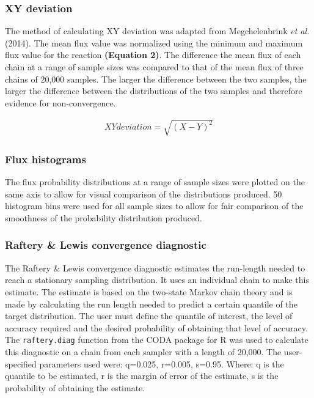 \documentclass[10pt,letterpaper]{article}
\begin{document}
\subsubsection*{XY deviation}
The method of calculating XY deviation was adapted from Megchelenbrink \textit{et al.} (2014)\cite{Megchelenbrink}. The mean flux value was normalized using the minimum and maximum flux value for the reaction \textbf{(Equation 2)}. The difference the mean flux of each chain at a range of sample sizes was compared to that of the mean flux of three chains of 20,000 samples. The larger the difference between the two samples, the larger the difference between the distributions of the two samples and therefore evidence for non-convergence. 

\begin{eqnarray}
\label{eq:test2}
XY deviation = \sqrt{(X-Y)^{2}}
\end{eqnarray}

\subsubsection*{Flux histograms}
The flux probability distributions at a range of sample sizes were plotted on the same axis to allow for visual comparison of the distributions produced. 50 histogram bins were used for all sample sizes to allow for fair comparison of the smoothness of the probability distribution produced.

\subsubsection*{Raftery \& Lewis convergence diagnostic}
The Raftery \& Lewis convergence diagnostic estimates the run-length needed to reach a stationary sampling distribution. It uses an individual chain to make this estimate. The estimate is based on the two-state Markov chain theory and is made by calculating the run length needed to predict a certain quantile of the target distribution. The user must define the quantile of interest, the level of accuracy required and the desired probability of obtaining that level of accuracy. The \texttt{raftery.diag} function from the CODA package for R was used to calculate this diagnostic on a chain from each sampler with a length of 20,000\cite{Plummer}. The user-specified parameters used were: q=0.025, r=0.005, s=0.95. Where: q is the quantile to be estimated, r is the margin of error of the estimate, s is the probability of obtaining the estimate.
\end{document}
